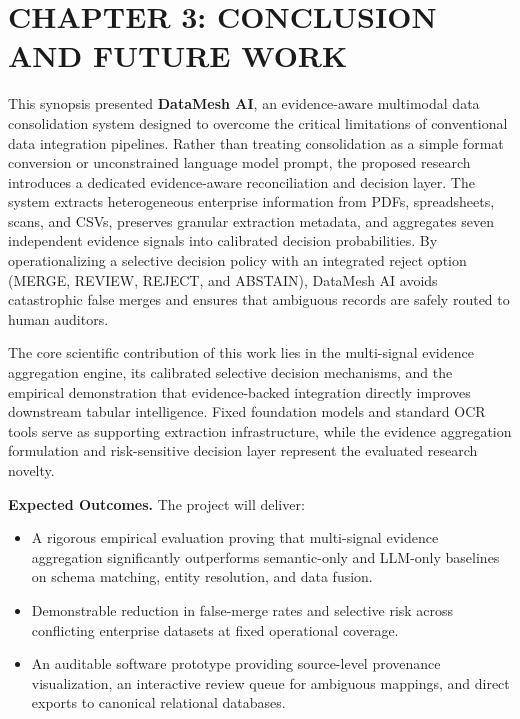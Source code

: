 \documentclass[12pt,a4paper]{article}
\newcommand{\chapter}[1]{%
  \clearpage
  \section*{#1}}
\begin{document}
\chapter{CHAPTER 3: CONCLUSION AND FUTURE WORK}\label{page:ch3}

This synopsis presented \textbf{DataMesh AI}, an evidence-aware multimodal data consolidation system designed to overcome the critical limitations of conventional data integration pipelines. Rather than treating consolidation as a simple format conversion or unconstrained language model prompt, the proposed research introduces a dedicated evidence-aware reconciliation and decision layer. The system extracts heterogeneous enterprise information from PDFs, spreadsheets, scans, and CSVs, preserves granular extraction metadata, and aggregates seven independent evidence signals into calibrated decision probabilities. By operationalizing a selective decision policy with an integrated reject option (MERGE, REVIEW, REJECT, and ABSTAIN), DataMesh AI avoids catastrophic false merges and ensures that ambiguous records are safely routed to human auditors.

The core scientific contribution of this work lies in the multi-signal evidence aggregation engine, its calibrated selective decision mechanisms, and the empirical demonstration that evidence-backed integration directly improves downstream tabular intelligence. Fixed foundation models and standard OCR tools serve as supporting extraction infrastructure, while the evidence aggregation formulation and risk-sensitive decision layer represent the evaluated research novelty.

\textbf{Expected Outcomes.} The project will deliver:
\begin{itemize}
  \item A rigorous empirical evaluation proving that multi-signal evidence aggregation significantly outperforms semantic-only and LLM-only baselines on schema matching, entity resolution, and data fusion.
  \item Demonstrable reduction in false-merge rates and selective risk across conflicting enterprise datasets at fixed operational coverage.
  \item An auditable software prototype providing source-level provenance visualization, an interactive review queue for ambiguous mappings, and direct exports to canonical relational databases.
\end{itemize}
\end{document}

